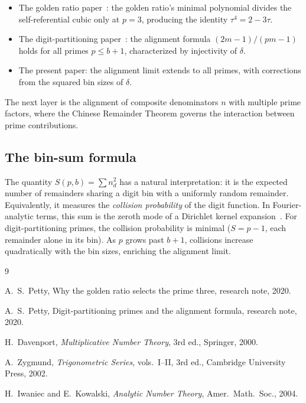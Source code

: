 \documentclass[12pt]{amsart}
\theoremstyle{definition}
\theoremstyle{remark}
\begin{document}
\begin{itemize}
\item The golden ratio paper~\cite{paper1}: the golden ratio's
      minimal polynomial divides the self-referential cubic only at
      $p = 3$, producing the identity $\tau^4 = 2 - 3\tau$.
\item The digit-partitioning paper~\cite{paper2}: the alignment
      formula $(2m{-}1)/(pm{-}1)$ holds for all primes
      $p \le b{+}1$, characterized by injectivity of $\delta$.
\item The present paper: the alignment limit extends to all primes,
      with corrections from the squared bin sizes of $\delta$.
\end{itemize}

The next layer is the alignment of composite denominators $n$ with
multiple prime factors, where the Chinese Remainder Theorem governs
the interaction between prime contributions.

\subsection*{The bin-sum formula}

The quantity $S(p,b) = \sum n_d^2$ has a natural interpretation: it
is the expected number of remainders sharing a digit bin with a
uniformly random remainder. Equivalently, it measures the
\emph{collision probability} of the digit function. In Fourier-analytic terms, this sum
is the zeroth mode of a Dirichlet kernel
expansion~\cite{zygmund}. For
digit-partitioning primes, the collision probability is minimal
($S = p{-}1$, each remainder alone in its bin). As $p$ grows past
$b{+}1$, collisions increase quadratically with the bin sizes,
enriching the alignment limit.

\begin{thebibliography}{9}

A.~S.~Petty,
Why the golden ratio selects the prime three,
research note, 2020.

A.~S.~Petty,
Digit-partitioning primes and the alignment formula,
research note, 2020.

H.~Davenport,
\emph{Multiplicative Number Theory},
3rd ed., Springer, 2000.

A.~Zygmund,
\emph{Trigonometric Series}, vols.~I--II,
3rd ed., Cambridge University Press, 2002.

H.~Iwaniec and E.~Kowalski,
\emph{Analytic Number Theory},
Amer.\ Math.\ Soc., 2004.

\end{thebibliography}
\end{document}
